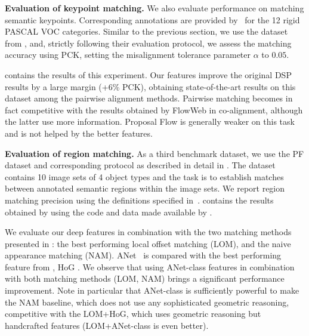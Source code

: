 \documentclass[10pt,twocolumn,letterpaper]{article}
\def\methodname{ANet\xspace}
\newcommand{\myparagraph}[1]{\vspace{0.15cm}\noindent\textbf{#1.}}
\begin{document}
\myparagraph{Evaluation of keypoint matching}
We also evaluate performance on matching semantic keypoints. Corresponding annotations are provided by~\cite{xiang2014beyond} for the 12 rigid PASCAL VOC categories. Similar to the previous section, we use the dataset from \cite{zhou15flowweb}, and, strictly following their evaluation protocol, we assess the matching accuracy using PCK, setting the misalignment tolerance parameter $\alpha$ to $0.05$.

 contains the results of this experiment. Our features improve the original DSP results by a large margin (+6\% PCK), obtaining state-of-the-art results on this dataset among the pairwise alignment methods. Pairwise matching becomes in fact competitive with the results obtained by FlowWeb in co-alignment, although the latter use more information. Proposal Flow is generally weaker on this task and is not helped by the better features. 

\myparagraph{Evaluation of region matching}
As a third benchmark dataset, we use the PF dataset and corresponding protocol as described in detail in \cite{ham2016}. 
The dataset contains 10 image sets of 4 object types and the task is to establish matches between annotated semantic regions within the image sets.
We report region matching precision using the definitions specified in~\cite{ham2016}. 
 contains the results obtained by using the code and data made available by \cite{ham2016}. 

We evaluate our deep features in combination with the two matching methods presented in \cite{ham2016}: the best performing local offset matching (LOM), and the naive appearance matching (NAM). \methodname ~ is compared with the best performing feature from \cite{ham2016}, \ie HoG \cite{hariharan2012discriminative}. We observe that using \methodname-class features %
in combination with both matching methods (LOM, NAM) brings a significant performance improvement.  
Note in particular that \methodname-class is sufficiently powerful to make the NAM baseline, which does not use any sophisticated geometric reasoning, competitive with the LOM+HoG, which uses geometric reasoning but handcrafted features (LOM+\methodname-class is even better).
\end{document}
